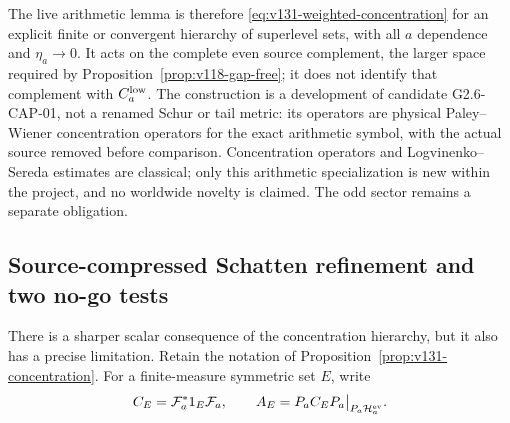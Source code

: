 \documentclass[11pt]{article}
\theoremstyle{remark}
\begin{document}
The live arithmetic lemma is therefore
\eqref{eq:v131-weighted-concentration} for an explicit finite or
convergent hierarchy of superlevel sets, with all $a$ dependence and
$\eta_a\to0$.  It acts on the complete even source complement, the
larger space required by Proposition~\ref{prop:v118-gap-free}; it does
not identify that complement with $C_a^{\rm low}$.  The construction
is a development of candidate G2.6-CAP-01, not a renamed Schur or tail
metric: its operators are physical Paley--Wiener concentration
operators for the exact arithmetic symbol, with the actual source
removed before comparison.  Concentration operators and
Logvinenko--Sereda estimates are classical; only this arithmetic
specialization is new within the project, and no worldwide novelty is
claimed.  The odd sector remains a separate obligation.

\subsection*{Source-compressed Schatten refinement and two no-go tests}

There is a sharper scalar consequence of the concentration hierarchy,
but it also has a precise limitation. Retain the notation of
Proposition~\ref{prop:v131-concentration}. For a finite-measure
symmetric set $E$, write
\[
 C_E=\mathcal F_a^*1_E\mathcal F_a,
 \qquad A_E=P_aC_EP_a\big|_{P_a\mathcal H_a^{\rm ev}}.
\]
\end{document}
